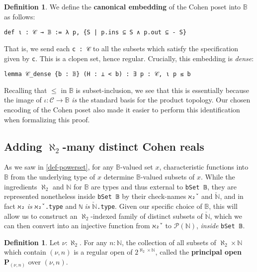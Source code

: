 \documentclass[a4paper,USenglish,cleveref, autoref]{lipics-v2019}
\newcommand{\B}{\mathbb{B}}
\newcommand{\lil}{\lstinline}
\newcommand{\N}{\mathbb{N}}
\theoremstyle{theorem}
\theoremstyle{definition}
\newtheorem{defn}[definition]{Definition}
\begin{document}
\begin{defn}
  We define the \textbf{canonical embedding} of the Cohen poset into $\B$ as follows:
  \begin{lstlisting}
def ι : 𝒞 → 𝔹 := λ p, {S | p.ins ⊆ S ∧ p.out ⊆ - S}
\end{lstlisting}
\end{defn}
That is, we send each \lil{c : 𝒞} to all the subsets which satisfy the specification given by \lil{c}. This is a clopen set, hence regular. Crucially, this embedding is \emph{dense}:
\begin{lstlisting}
lemma 𝒞_dense {b : 𝔹} (H : ⊥ < b) : ∃ p : 𝒞, ι p ≤ b
\end{lstlisting}
Recalling that $\leq$ in $\B$ is subset-inclusion, we see that this is essentially because the image of $\iota : \mathcal{C} \to \B$ \emph{is} the standard basis for the product topology. Our chosen encoding of the Cohen poset also made it easier to perform this identification when formalizing this proof.
\subsection{Adding $\aleph_2$-many distinct Cohen reals} \label{subsect:cohen-reals}
As we saw in \autoref{def-powerset}, for any $\B$-valued set $x$, characteristic functions into $\B$ from the underlying type of $x$ determine $\B$-valued subsets of $x$. While the ingredients $\aleph_2$ and $\mathbb{N}$ for $\B$ are types and thus external to \lil{bSet 𝔹}, they are represented nonetheless inside \lil{bSet 𝔹} by their check-names \lil{ℵ₂̌ } and $\check{\mathbb{N}}$, and in fact \lil{ℵ₂} \emph{is} \lil{ℵ₂̌ .type} and \lil{ℕ} \emph{is} $\check{\mathbb{N}}$\lil{.type}. Given our specific choice of $\B$, this will allow us to construct an $\aleph_2$-indexed family of distinct subsets of $\check{\N}$, which we can then convert into an injective function from \lil{ℵ₂̌ } to $\mathcal{P}(\mathbb{N})$, \emph{inside} \lil{bSet 𝔹}.

\begin{defn}
  Let $\nu : \aleph_2$. For any $n : \N$, the collection of all subsets of $\aleph_2 \times \N$ which contain $(\nu, n)$ is a regular open of $2^{\aleph_2 \times \N}$, called the \textbf{principal open} $\mathbf{P}_{(\nu, n)}$ over $(\nu, n)$.
\end{defn}
\end{document}
